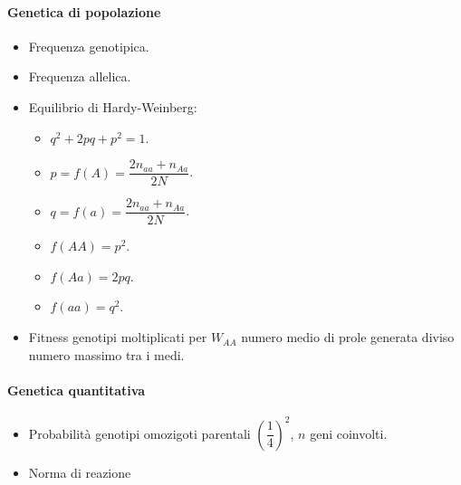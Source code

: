\begin{multicols}{2}
\paragraph*{Genetica di popolazione}
\begin{itemize}
	\item Frequenza genotipica.
	\item Frequenza allelica.
	\item Equilibrio di Hardy-Weinberg:
		\begin{itemize}
			\item $q^2+2pq+p^2 = 1$.
			\item $p = f(A) = \dfrac{2n_{aa} + n_{Aa}}{2N}$.
			\item $q = f(a) = \dfrac{2n_{aa}+n_{Aa}}{2N}$.
			\item $f(AA) = p^2$.
			\item $f(Aa) = 2pq$.
			\item $f(aa) = q^2$.
		\end{itemize}
	\item Fitness genotipi moltiplicati per $W_{AA}$ numero medio di prole generata diviso numero massimo tra i medi.
\end{itemize}

\paragraph*{Genetica quantitativa}
\begin{itemize}
	\item Probabilit\`a genotipi omozigoti parentali $(\dfrac{1}{4})^2$, $n$ geni coinvolti.
	\item Norma di reazione

\end{itemize}
\end{multicols}



